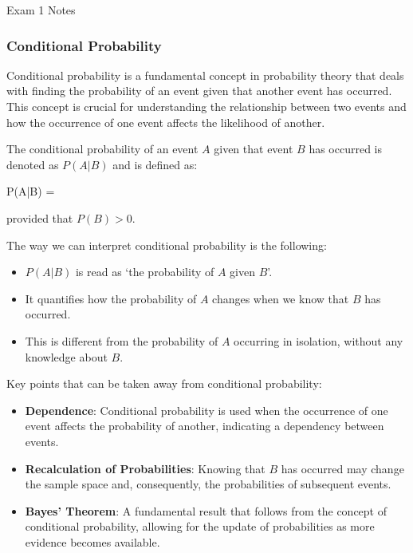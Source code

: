 \begin{examnotes}{Exam 1 Notes}
    \subsubsection*{Conditional Probability}

    Conditional probability is a fundamental concept in probability theory that deals with finding the probability of an event given that another event has occurred. This concept is crucial for 
    understanding the relationship between two events and how the occurrence of one event affects the likelihood of another.

    The conditional probability of an event $A$ given that event $B$ has occurred is denoted as $P(A|B)$ and is defined as:

    \begin{center}
        \begin{highlightbox}
            P(A|B) = 
        \end{highlightbox}
    \end{center}
    provided that $P(B) > 0$.

    The way we can interpret conditional probability is the following:
    \begin{itemize}
        \item $P(A|B)$ is read as `the probability of $A$ given $B$'.
        \item It quantifies how the probability of $A$ changes when we know that $B$ has occurred.
        \item This is different from the probability of $A$ occurring in isolation, without any knowledge about $B$.
    \end{itemize}
    Key points that can be taken away from conditional probability:
    \begin{itemize}
        \item \textbf{Dependence}: Conditional probability is used when the occurrence of one event affects the probability of another, indicating a dependency between events.
        \item \textbf{Recalculation of Probabilities}: Knowing that $B$ has occurred may change the sample space and, consequently, the probabilities of subsequent events.
        \item \textbf{Bayes' Theorem}: A fundamental result that follows from the concept of conditional probability, allowing for the update of probabilities as more evidence becomes available.
    \end{itemize}


\end{examnotes}
